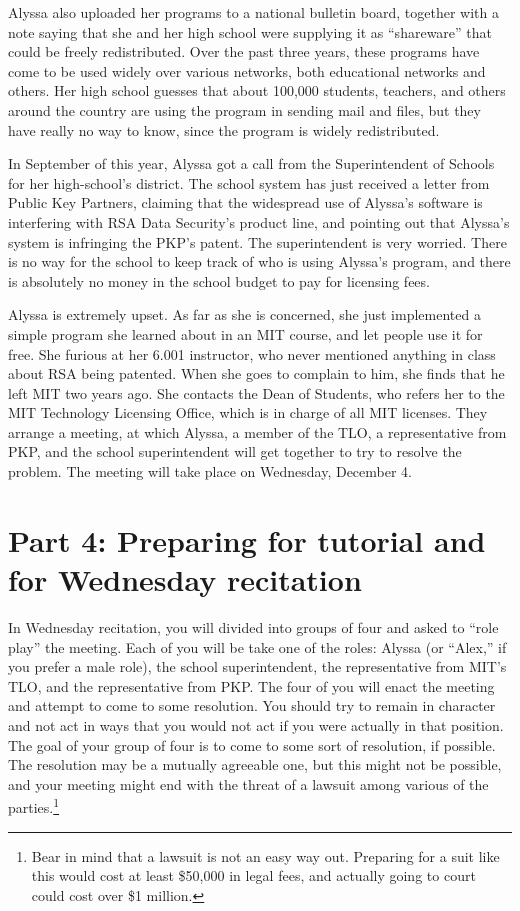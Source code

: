 Alyssa also uploaded her programs to a national bulletin board,
together with a note saying that she and her high school were
supplying it as ``shareware'' that could be freely redistributed.
Over the past three years, these programs have come to be used widely
over various networks, both educational networks and others.  Her high
school guesses that about 100,000 students, teachers, and others
around the country are using the program in sending mail and files,
but they have really no way to know, since the program is widely
redistributed.

In September of this year, Alyssa got a call from the Superintendent
of Schools for her high-school's district.  The school system has just
received a letter from Public Key Partners, claiming that the
widespread use of Alyssa's software is interfering with RSA Data
Security's product line, and pointing out that Alyssa's system is
infringing the PKP's patent.  The superintendent is very worried.
There is no way for the school to keep track of who is using Alyssa's
program, and there is absolutely no money in the school budget to pay
for licensing fees.

Alyssa is extremely upset.  As far as she is concerned, she just
implemented a simple program she learned about in an MIT course, and
let people use it for free.  She furious at her 6.001 instructor, who
never mentioned anything in class about RSA being patented.  When she
goes to complain to him, she finds that he left MIT two years ago.
She contacts the Dean of Students, who refers her to the MIT
Technology Licensing Office, which is in charge of all MIT licenses.
They arrange a meeting, at which Alyssa, a member of the TLO, a
representative from PKP, and the school superintendent will get
together to try to resolve the problem.  The meeting will take place
on Wednesday, December 4.


\section{Part 4:  Preparing for tutorial and for Wednesday recitation}

In Wednesday recitation, you will divided into groups of four and
asked to ``role play'' the meeting.  Each of you will be take one of
the roles: Alyssa (or ``Alex,'' if you prefer a male role), the school
superintendent, the representative from MIT's TLO, and the
representative from PKP.  The four of you will enact the meeting and
attempt to come to some resolution.  You should try to remain in
character and not act in ways that you would not act if you were
actually in that position.  The goal of your group of four is to come
to some sort of resolution, if possible.  The resolution may be a
mutually agreeable one, but this might not be possible, and your
meeting might end with the threat of a lawsuit among various of the
parties.\footnote{Bear in mind that a lawsuit is not an easy way out.
Preparing for a suit like this would cost at least \$50,000 in legal
fees, and actually going to court could cost over \$1 million.}

